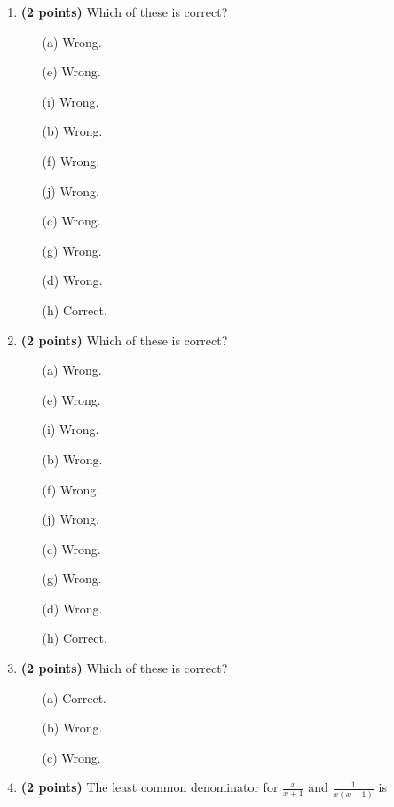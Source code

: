 \documentclass[12pt]{amsart}
\begin{document}
\newpage
\begin{enumerate}
\item {\bf (2 points)} 
 Which of these is correct?

\begin{minipage}[t]{1.0\linewidth}\begin{multicols}{4}\begin{itemize}\item[(a)]  Wrong. \item[(e)]  Wrong. \item[(i)]  Wrong. \item[(b)]  Wrong. \item[(f)]  Wrong. \item[(j)]  Wrong. \item[(c)]  Wrong. \item[(g)]  Wrong. \item[] \item[(d)]  Wrong. \item[(h)]  Correct. \item[] \end{itemize}\end{multicols}\end{minipage} \vfill 
\item {\bf (2 points)} 
 Which of these is correct?

\begin{minipage}[t]{1.0\linewidth}\begin{multicols}{4}\begin{itemize}\item[(a)]  Wrong. \item[(e)]  Wrong. \item[(i)]  Wrong. \item[(b)]  Wrong. \item[(f)]  Wrong. \item[(j)]  Wrong. \item[(c)]  Wrong. \item[(g)]  Wrong. \item[] \item[(d)]  Wrong. \item[(h)]  Correct. \item[] \end{itemize}\end{multicols}\end{minipage} \vfill 
\item {\bf (2 points)} 
 Which of these is correct?

\begin{minipage}[t]{1.0\linewidth}\begin{multicols}{3}\begin{itemize}\item[(a)]  Correct. \item[(b)]  Wrong. \item[(c)]  Wrong. \end{itemize}\end{multicols}\end{minipage} \vfill 
\item {\bf (2 points)} 
 The least common denominator for $\displaystyle \frac{x}{x+1}$ and $\displaystyle \frac{1}{x(x-1)}$ is \vspace{.2cm}


\end{enumerate}
\end{document}
